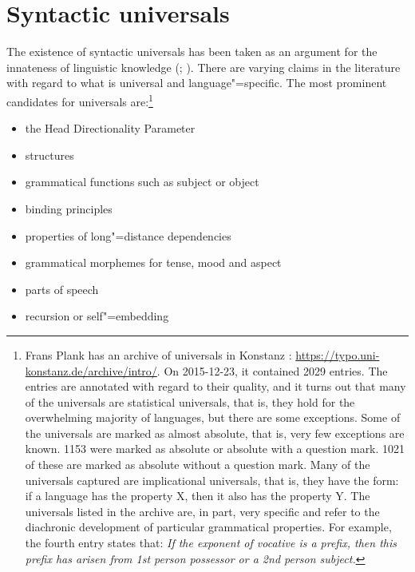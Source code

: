 \section{Syntactic universals}
\label{sec-syntactic-universals}

The existence of syntactic universals has been taken as an argument for the innateness of linguistic knowledge
(\eg \citealp[]{Chomsky98a-u}; %
\citealp[--238]{Pinker94a}). There are varying claims in the literature with regard to what is universal and 
language"=specific. The most prominent candidates for universals are:\footnote{%
Frans Plank has an archive of universals in Konstanz \citep{PF2000a}:
\url{https://typo.uni-konstanz.de/archive/intro/}. On 2015-12-23, it contained 2029 entries.
The entries are annotated with regard to their quality, and it turns out that many of the universals
are statistical universals, that is, they hold for the overwhelming majority of languages, but there are
some exceptions. Some of the universals are marked as almost absolute, that is, very few exceptions are known.
1153 were marked as absolute or absolute with a question mark. 1021 of these are marked as absolute without
a question mark. Many of the universals captured are implicational universals, that is, they have the form:
if a language has the property X, then it also has the property Y. The universals listed in the archive
are, in part, very specific and refer to the diachronic development of particular grammatical
properties. For example, the fourth entry states that: \emph{If the exponent of
  vocative is a prefix, then this prefix has arisen from 1st person possessor or a 2nd person
  subject.} 
}\nocite{Harbour2011a}

\begin{itemize}
\item the Head Directionality Parameter
\item \xbar structures
\item grammatical functions such as subject or object
\item binding principles
\item properties of long"=distance dependencies
\item grammatical morphemes for tense, mood and aspect
\item parts of speech
\item recursion or self"=embedding
\end{itemize}

